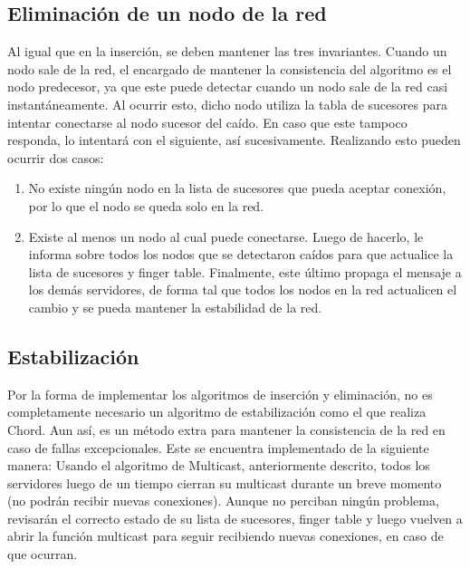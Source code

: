 \documentclass[10pt, a4paper]{article}
\begin{document}
    \subsection{Eliminaci\'on de un nodo de la red}
    Al igual que en la inserción, se deben mantener las tres invariantes. Cuando un nodo sale de la red, el encargado de mantener la consistencia del algoritmo es el nodo predecesor, ya que este puede detectar cuando un nodo sale de la red casi instantáneamente. Al ocurrir esto, dicho nodo utiliza la tabla de sucesores para intentar conectarse al nodo sucesor del caído. En caso que este tampoco responda, lo intentar\'a con el siguiente, así sucesivamente. Realizando esto pueden ocurrir dos casos:
    \begin{enumerate}
    	\item No existe ningún nodo en la lista de sucesores que pueda aceptar conexión, por lo que el nodo se queda solo en la red.
    	\item Existe al menos un nodo al cual puede conectarse. Luego de hacerlo, le informa sobre todos los nodos que se detectaron caídos para que actualice la lista de sucesores y finger table. Finalmente, este \'ultimo propaga el mensaje a los demás servidores, de forma tal que todos los nodos en la red actualicen el cambio y se pueda mantener la estabilidad de la red.\\
    \end{enumerate}
    
    \subsection{Estabilizaci\'on}
    Por la forma de implementar los algoritmos de inserción y eliminación, no es completamente necesario un algoritmo de estabilización como el que realiza Chord. Aun así, es un método extra para mantener la consistencia de la red en caso de fallas excepcionales.
    Este se encuentra implementado de la siguiente manera:
    Usando el algoritmo de Multicast, anteriormente descrito, todos los servidores luego de un tiempo cierran su multicast durante un breve momento (no podrán recibir nuevas conexiones). Aunque no perciban ningún problema, revisar\'an el correcto estado de su lista de sucesores,  finger table y luego vuelven a abrir la funci\'on multicast para seguir recibiendo nuevas conexiones, en caso de que ocurran.\\
    
\end{document}
